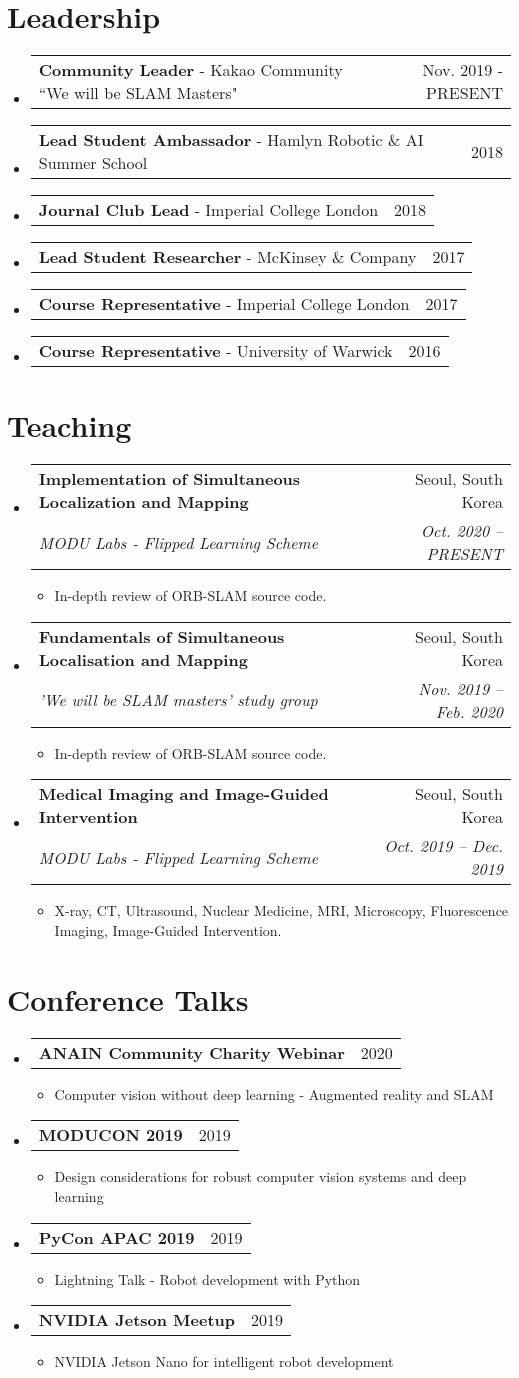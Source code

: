 \documentclass[letterpaper,11pt]{article}
\makeatletter
\newcommand{\resumeItem}[1]{
  \item\small{
    {#1 \vspace{-2pt}}
  }
}
\newcommand{\resumeSubheading}[4]{
  \vspace{-1pt}\item
    \begin{tabular*}{0.97\textwidth}[t]{l@{\extracolsep{\fill}}r}
      \textbf{#1} & #2 \\
      \textit{\small#3} & \textit{\small #4} \\
    \end{tabular*}\vspace{-5pt}
}
\newcommand{\resumeTalk}[2]{
  \vspace{-1pt}\item
    \begin{tabular*}{0.97\textwidth}[t]{l@{\extracolsep{\fill}}r}
      \textbf{#1} & #2 \\
    \end{tabular*}\vspace{-5pt}
}
\newcommand{\resumeLeadership}[2]{
  \item
    \begin{tabular*}{0.97\textwidth}[t]{l@{\extracolsep{\fill}}r}
      #1 & #2
    \end{tabular*}
}
\newcommand{\resumeSubHeadingListStart}{\begin{itemize}[leftmargin=*]}
\newcommand{\resumeSubHeadingListEnd}{\end{itemize}}
\newcommand{\resumeItemListStart}{\begin{itemize}}
\newcommand{\resumeItemListEnd}{\end{itemize}\vspace{-5pt}}
\makeatother
\begin{document}

\section{Leadership}
  \resumeSubHeadingListStart
    \resumeLeadership{\textbf{Community Leader} - Kakao Community ``We will be SLAM Masters"}{Nov. 2019 - PRESENT}
    \resumeLeadership{\textbf{Lead Student Ambassador} - Hamlyn Robotic \& AI Summer School}{2018}
    \resumeLeadership{\textbf{Journal Club Lead} - Imperial College London}{2018}
    \resumeLeadership{\textbf{Lead Student Researcher} - McKinsey \& Company}{2017}
    \resumeLeadership{\textbf{Course Representative} - Imperial College London}{2017}
    \resumeLeadership{\textbf{Course Representative} - University of Warwick}{2016}
  \resumeSubHeadingListEnd

\section{Teaching}
    \resumeSubHeadingListStart
        \resumeSubheading{Implementation of Simultaneous Localization and Mapping}{Seoul, South Korea}
            {MODU Labs - Flipped Learning Scheme}{Oct. 2020 -- PRESENT}
            \resumeItemListStart
                \resumeItem{In-depth review of ORB-SLAM source code.}
            \resumeItemListEnd   
        \resumeSubheading{Fundamentals of Simultaneous Localisation and Mapping}{Seoul, South Korea}
        {'We will be SLAM masters' study group}{Nov. 2019 -- Feb. 2020}
            \resumeItemListStart
                \resumeItem{In-depth review of ORB-SLAM source code.}
            \resumeItemListEnd    
        \resumeSubheading{Medical Imaging and Image-Guided Intervention}{Seoul, South Korea}
        {MODU Labs - Flipped Learning Scheme}{Oct. 2019 -- Dec. 2019}
            \resumeItemListStart
                \resumeItem{X-ray, CT, Ultrasound, Nuclear Medicine, MRI, Microscopy, Fluorescence Imaging, Image-Guided Intervention.}
            \resumeItemListEnd
    \resumeSubHeadingListEnd

\section{Conference Talks}
    \resumeSubHeadingListStart
        \resumeTalk{ANAIN Community Charity Webinar}{2020}
            \resumeItemListStart
                \resumeItem{Computer vision without deep learning - Augmented reality and SLAM}
            \resumeItemListEnd
        \resumeTalk{MODUCON 2019}{2019}
            \resumeItemListStart
                \resumeItem{Design considerations for robust computer vision systems and deep learning}
            \resumeItemListEnd
        \resumeTalk{PyCon APAC 2019}{2019}
            \resumeItemListStart
                \resumeItem{Lightning Talk - Robot development with Python}
            \resumeItemListEnd
        \resumeTalk{NVIDIA Jetson Meetup}{2019}
            \resumeItemListStart
                \resumeItem{NVIDIA Jetson Nano for intelligent robot development}
            \resumeItemListEnd
    \resumeSubHeadingListEnd
\end{document}
